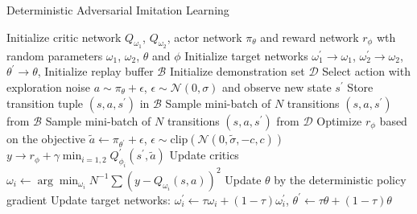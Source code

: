 \begin{algorithm}
\caption{Deterministic Adversarial Imitation Learning}
\begin{algorithmic}[1] %
\STATE Initialize critic network $Q_{\omega_1}$, $Q_{\omega_2}$, actor network $\pi_{\theta}$ and reward network $r_{\phi}$ wth random parameters $\omega_1$, $\omega_2$, $\theta$ and $\phi$
\STATE Initialize target networks $\omega_1^\prime\rightarrow\omega_1$, $\omega_2^\prime\rightarrow\omega_2$, $\theta^\prime\rightarrow\theta$,
\STATE Initialize replay buffer $\mathcal{B}$
\STATE Initialize demonstration set $\mathcal{D}$
\STATE Select action with exploration noise $a\sim\pi_{\theta} + \epsilon$, $\epsilon\sim \mathcal{N}(0, \sigma)$ and observe new state $s^\prime$
\STATE Store transition tuple $(s, a, s^\prime)$ in $\mathcal{B}$
\STATE Sample mini-batch of $N$ transitions $(s, a, s^\prime)$ from $\mathcal{B}$
\STATE Sample mini-batch of $N$ transitions $(s, a, s^\prime)$ from $\mathcal{D}$
\STATE Optimize $r_{\phi}$ based on the objective
\ENDIF
\STATE $\tilde{a} \leftarrow \pi_{\theta^\prime}+\epsilon$, $\epsilon\sim \text{clip}(\mathcal{N}(0, \tilde{\sigma}, -c, c))$
\STATE $y\rightarrow r_{\phi}+\gamma \min_{i=1, 2}Q_{\phi_i}^\prime(s^\prime, \tilde{a})$
\STATE Update critics $\omega_i\leftarrow \arg\min_{\omega_i} N^{-1}\sum(y - Q_{\omega_i}(s, a))^2$
\STATE Update $\theta$ by the deterministic policy gradient
\STATE Update target networks: $\omega_i^\prime\leftarrow \tau \omega_i + (1-\tau)\omega_i^\prime$, $\theta^\prime \leftarrow \tau \theta + (1-\tau)\theta $
\ENDIF
\ENDFOR
\end{algorithmic}
\end{algorithm}
